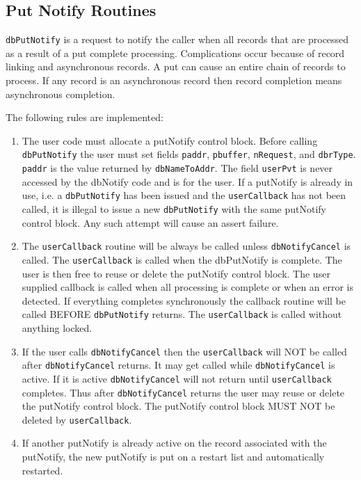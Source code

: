 \subsection{Put Notify Routines}

\verb|dbPutNotify| is a request to notify the caller when all records that are processed as a result of a put complete 
processing. Complications occur because of record linking and asynchronous records. A put can cause an entire chain of 
records to process. If any record is an asynchronous record then record completion means asynchronous completion.

The following rules are implemented:

\begin{enumerate}\item The user code must allocate a putNotify control block. Before calling \verb|dbPutNotify| the user must set fields 
\verb|paddr|, \verb|pbuffer|, \verb|nRequest|, and \verb|dbrType|. \verb|paddr| is the value returned by \verb|dbNameToAddr|. The field 
\verb|userPvt| is never accessed by the dbNotify code and is for the user. If a putNotify is already in use, i.e. a 
\verb|dbPutNotify| has been issued and the \verb|userCallback| has not been called, it is illegal to issue a new 
\verb|dbPutNotify| with the same putNotify control block. Any such attempt will cause an assert failure.

\item The \verb|userCallback| routine will be always be called unless \verb|dbNotifyCancel| is called. The \verb|userCallback| 
is called when the dbPutNotify is complete. The user is then free to reuse or delete the putNotify control block. The 
user supplied callback is called when all processing is complete or when an error is detected. If everything 
completes synchronously the callback routine will be called BEFORE \verb|dbPutNotify| returns. The 
\verb|userCallback| is called without anything locked.

\item If the user calls \verb|dbNotifyCancel| then the \verb|userCallback| will NOT be called after \verb|dbNotifyCancel| 
returns. It may get called while \verb|dbNotifyCancel| is active. If it is active \verb|dbNotifyCancel| will not return 
until \verb|userCallback| completes.     Thus after \verb|dbNotifyCancel| returns the user may reuse or delete the 
putNotify control block. The putNotify control block MUST NOT be deleted by \verb|userCallback|.

\item If another putNotify is already active on the record associated with the putNotify, the new putNotify is put on a 
restart list and automatically restarted.


\end{enumerate}
